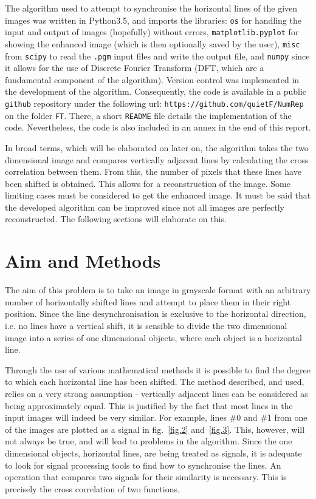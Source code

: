 \documentclass[a4paper,12pt]{article}
\begin{document}
The algorithm used to attempt to synchronise the horizontal lines of the given images was written in Python3.5, and imports the libraries: \texttt{os} for handling the input and output of images (hopefully) without errors, \texttt{matplotlib.pyplot} for showing the enhanced image (which is then optionally saved by the user), \texttt{misc} from \texttt{scipy} to read the \texttt{.pgm} input files and write the output file, and \texttt{numpy} since it allows for the use of Discrete Fourier Transform (DFT, which are a fundamental component of the algorithm). Version control was implemented in the development of the algorithm. Consequently, the code is available in a public \texttt{github} repository under the following url: \texttt{https://github.com/quietF/NumRep} on the folder \texttt{FT}. There, a short \texttt{README} file details the implementation of the code. Nevertheless, the code is also included in an annex in the end of this report. 

In broad terms, which will be elaborated on later on, the algorithm takes the two dimensional image and compares vertically adjacent lines by calculating the cross correlation between them. From this, the number of pixels that these lines have been shifted is obtained. This allows for a reconstruction of the image. Some limiting cases must be considered to get the enhanced image. It must be said that the developed algorithm can be improved since not all images are perfectly reconstructed. The following sections will elaborate on this. 

\section{Aim and Methods}

The aim of this problem is to take an image in grayscale format with an arbitrary number of horizontally shifted lines and attempt to place them in their right position. Since the line desynchronisation is exclusive to the horizontal direction, i.e. no lines have a vertical shift, it is sensible to divide the two dimensional image into a series of one dimensional objects, where each object is a horizontal line. 

Through the use of various mathematical methods it is possible to find the degree to which each horizontal line has been shifted. The method described, and used, relies on a very strong assumption - vertically adjacent lines can be considered as being approximately equal. This is justified by the fact that most lines in the input images will indeed be very similar. For example, lines \#0 and \#1 from one of the images are plotted as a signal in fig.~\ref{fig.2} and~\ref{fig.3}. This, however, will not always be true, and will lead to problems in the algorithm. Since the one dimensional objects, horizontal lines, are being treated as signals, it is adequate to look for signal processing tools to find how to synchronise the lines. An operation that compares two signals for their similarity is necessary. This is precisely the cross correlation of two functions.
\end{document}
